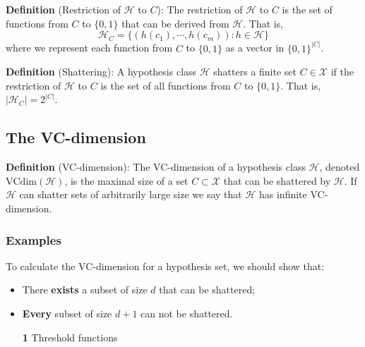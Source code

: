 \documentclass{article}
\begin{document}
\textbf{Definition} (Restriction of $\mathcal{H}$ to $C$): The restriction of $\mathcal{H}$ to $C$ is the set of functions from $C$ to $\{0,1\}$ that can be derived from $\mathcal{H}$. That is,
	\begin{equation}
	\mathcal{H}_C=\{(h(c_1),\cdots,h(c_m)):h\in\mathcal{H}\}
	\end{equation}
where we represent each function from $C$ to $\{0,1\}$ as a vector in $\{0,1\}^{|C|}$.

\textbf{Definition} (Shattering): A hypothesis class $\mathcal{H}$ shatters a finite set $C\in\mathcal{X}$ if the restriction of $\mathcal{H}$ to $C$ is the set of all functions from $C$ to $\{0,1\}$. That is, $|\mathcal{H}_C|=2^{|C|}$.
%
\subsection{The VC-dimension}
\textbf{Definition} (VC-dimension): The VC-dimension of a hypothesis class $\mathcal{H}$, denoted $\mathrm{VCdim}(\mathcal{H})$, is the maximal size of a set $C\subset\mathcal{X}$ that can be shattered by $\mathcal{H}$. If $\mathcal{H}$ can shatter sets of arbitrarily large size we say that $\mathcal{H}$ has infinite VC-dimension.

\subsubsection{Examples}

	To calculate the VC-dimension for a hypothesis set, we should show that:
	\begin{itemize}
	\item There \textbf{exists} a subset of size $d$ that can be shattered;
	\item \textbf{Every} subset of size $d+1$ can not be shattered.
	\end{itemize}
	
	\begin{itemize}
	\item [\textbf{1}] Threshold functions
	\end{itemize}
\end{document}

